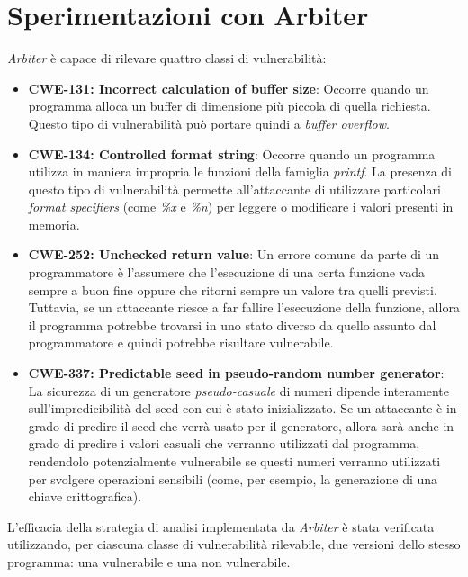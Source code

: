\documentclass[../main.tex]{subfiles}
\begin{document}
\section{Sperimentazioni con Arbiter}
\textit{Arbiter} è capace di rilevare quattro classi di vulnerabilità:
\begin{itemize}
    \item \textbf{CWE-131: Incorrect calculation of buffer size}: Occorre quando un programma alloca un buffer di dimensione più
    piccola di quella richiesta. Questo tipo di vulnerabilità può portare quindi a \textit{buffer overflow}.
    \item \textbf{CWE-134: Controlled format string}: Occorre quando un programma utilizza in maniera impropria le funzioni della famiglia
    \textit{printf}. La presenza di questo tipo di vulnerabilità permette all'attaccante di utilizzare particolari \textit{format specifiers} (come \textit{\%x} e \textit{\%n})
    per leggere o modificare i valori presenti in memoria.
    \item \textbf{CWE-252: Unchecked return value}: Un errore comune da parte di un programmatore è l'assumere che l'esecuzione di una certa funzione vada sempre a buon fine oppure che ritorni sempre
    un valore tra quelli previsti. Tuttavia, se un attaccante riesce a far fallire l'esecuzione della funzione, allora il programma potrebbe trovarsi in uno stato diverso da quello assunto
    dal programmatore e quindi potrebbe risultare vulnerabile.
    \item \textbf{CWE-337: Predictable seed in pseudo-random number generator}: La sicurezza di un generatore \textit{pseudo-casuale} di numeri dipende interamente sull'impredicibilità del seed con cui è stato
    inizializzato. Se un attaccante è in grado di predire il seed che verrà usato per il generatore, allora sarà anche in grado di predire i valori casuali che verranno utilizzati dal programma, rendendolo potenzialmente vulnerabile
    se questi numeri verranno utilizzati per svolgere operazioni sensibili (come, per esempio, la generazione di una chiave crittografica).
\end{itemize}
L'efficacia della strategia di analisi implementata da \textit{Arbiter} è stata verificata utilizzando, per ciascuna classe di vulnerabilità rilevabile, due versioni
dello stesso programma: una vulnerabile e una non vulnerabile.
\end{document}

